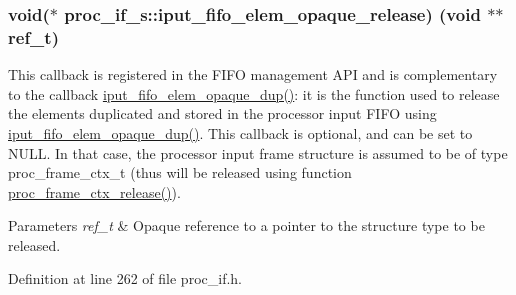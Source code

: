 \subsubsection[{\texorpdfstring{iput\+\_\+fifo\+\_\+elem\+\_\+opaque\+\_\+release}{iput_fifo_elem_opaque_release}}]{\setlength{\rightskip}{0pt plus 5cm}void($\ast$ proc\+\_\+if\+\_\+s\+::iput\+\_\+fifo\+\_\+elem\+\_\+opaque\+\_\+release) (void $\ast$$\ast$ref\+\_\+t)}\hypertarget{structproc__if__s_aec3bf948ff945ac2f5a4c834ea3b57da}{}\label{structproc__if__s_aec3bf948ff945ac2f5a4c834ea3b57da}
This callback is registered in the F\+I\+FO management A\+PI and is complementary to the callback \textquotesingle{}\hyperlink{structproc__if__s_a558cec57df436699d4154775894f2313}{iput\+\_\+fifo\+\_\+elem\+\_\+opaque\+\_\+dup()}\textquotesingle{}\+: it is the function used to release the elements duplicated and stored in the processor input F\+I\+FO using \textquotesingle{}\hyperlink{structproc__if__s_a558cec57df436699d4154775894f2313}{iput\+\_\+fifo\+\_\+elem\+\_\+opaque\+\_\+dup()}\textquotesingle{}. This callback is optional, and can be set to N\+U\+LL. In that case, the processor input frame structure is assumed to be of type proc\+\_\+frame\+\_\+ctx\+\_\+t (thus will be released using function \textquotesingle{}\hyperlink{proc__if_8c_afad6906a6da22ba369b736863c1e204e}{proc\+\_\+frame\+\_\+ctx\+\_\+release()}\textquotesingle{}). 
\begin{DoxyParams}{Parameters}
{\em ref\+\_\+t} & Opaque reference to a pointer to the structure type to be released. \\
\hline
\end{DoxyParams}


Definition at line 262 of file proc\+\_\+if.\+h.

